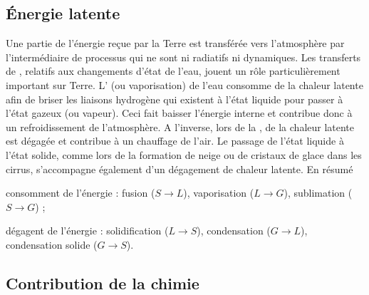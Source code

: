 
\sk
\subsection{\'Energie latente}

\sk
Une partie de l’énergie reçue par la Terre est transférée vers l’atmosphère par l’intermédiaire de processus qui ne sont ni radiatifs ni dynamiques. Les transferts de , relatifs aux changements d'état de l'eau, jouent un rôle particulièrement important sur Terre. L' (ou vaporisation) de l'eau consomme de la chaleur latente afin de briser les liaisons hydrogène qui existent à l'état liquide pour passer à l'état gazeux (ou vapeur). Ceci fait baisser l’énergie interne et contribue donc à un refroidissement de l'atmosphère. A l'inverse, lors de la , de la chaleur latente est dégagée et contribue à un chauffage de l'air. Le passage de l’état liquide à l’état solide, comme lors de la formation de neige ou de cristaux de glace dans les cirrus, s’accompagne également d’un dégagement de chaleur latente. En résumé
\begin{citemize}
\item consomment de l'énergie : fusion ($S \rightarrow L$), vaporisation ($L \rightarrow G$), sublimation ($S \rightarrow G$) ; 
\item dégagent de l'énergie : solidification ($L \rightarrow S$), condensation ($G \rightarrow L$), condensation solide ($G \rightarrow S$).
\end{citemize}

\sk
\subsection{Contribution de la chimie}

